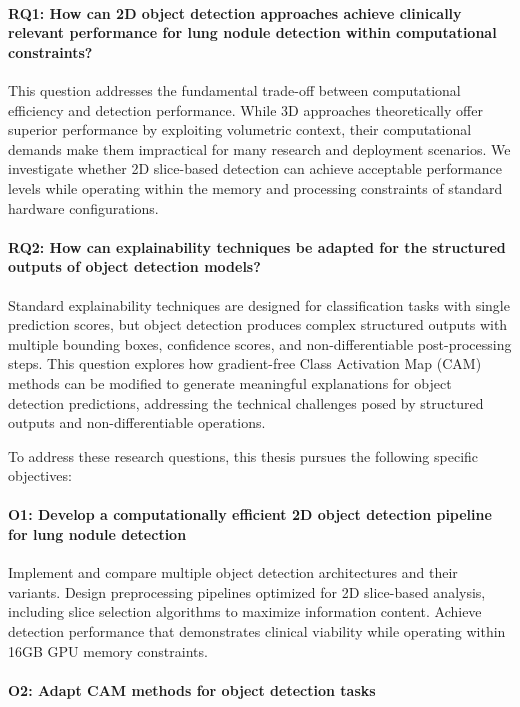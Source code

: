 \paragraph{RQ1: How can 2D object detection approaches achieve clinically relevant performance for lung nodule detection within computational constraints?}
This question addresses the fundamental trade-off between computational efficiency and detection performance. While 3D approaches theoretically offer superior performance by exploiting volumetric context, their computational demands make them impractical for many research and deployment scenarios. We investigate whether 2D slice-based detection can achieve acceptable performance levels while operating within the memory and processing constraints of standard hardware configurations.

\paragraph{RQ2: How can explainability techniques be adapted for the structured outputs of object detection models?}
Standard explainability techniques are designed for classification tasks with single prediction scores, but object detection produces complex structured outputs with multiple bounding boxes, confidence scores, and non-differentiable post-processing steps. This question explores how gradient-free Class Activation Map (CAM) methods can be modified to generate meaningful explanations for object detection predictions, addressing the technical challenges posed by structured outputs and non-differentiable operations.\bigskip

To address these research questions, this thesis pursues the following specific objectives:
\paragraph{O1: Develop a computationally efficient 2D object detection pipeline for lung nodule detection}
Implement and compare multiple object detection architectures and their variants.
Design preprocessing pipelines optimized for 2D slice-based analysis, including slice selection algorithms to maximize information content.
Achieve detection performance that demonstrates clinical viability while operating within 16GB GPU memory constraints.

\paragraph{O2: Adapt CAM methods for object detection tasks}

